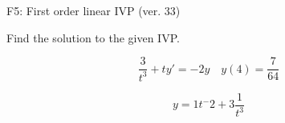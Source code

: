 \begin{exercise}
  \begin{exerciseTitle}F5: First order linear IVP (ver. 33)\end{exerciseTitle}
  \begin{exerciseStatement}
    
Find the solution to the given IVP.

    
\[\frac{3}{t^{3}} +ty'= -2 y \hspace{1em} y( 4 ) = \frac{7}{64}\]

  \end{exerciseStatement}
  \begin{exerciseAnswer}
    
\[y= 1 t^ -2 +3 \frac{1}{t^{3}}\]

  \end{exerciseAnswer}
\end{exercise}